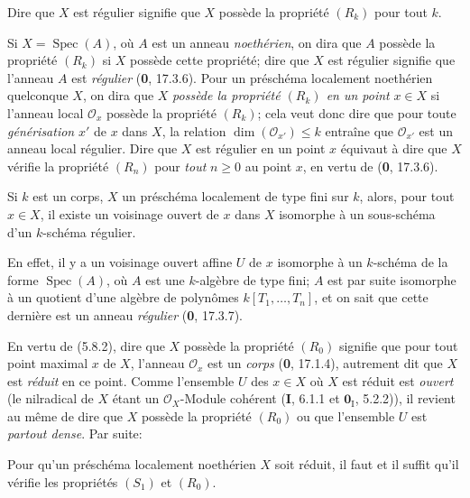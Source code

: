 Dire que $X$ est régulier signifie que $X$ possède la propriété $(R_k)$ pour
tout $k$.

Si $X=\operatorname{Spec}(A)$, où $A$ est un anneau \emph{noethérien}, on dira que
$A$ possède la propriété $(R_k)$ si $X$ possède cette propriété; dire que
$X$ est régulier signifie que l'anneau $A$ est \emph{régulier} (\textbf{0}, 17.3.6). Pour un
préschéma localement noethérien quelconque $X$, on dira que $X$ \emph{possède la
propriété $(R_k)$ en un point} $x\in X$ si l'anneau local $\mathcal O_x$
possède la propriété $(R_k)$; cela veut donc dire que pour toute \emph{générisation}
$x'$ de $x$ dans $X$, la relation $\dim(\mathcal O_{x'})\leq k$ entraîne que
$\mathcal O_{x'}$ est un anneau local régulier. Dire que $X$ est régulier en
un point $x$ équivaut à dire que $X$ vérifie la propriété $(R_n)$ pour \emph{tout}
$n\geq0$ au point $x$, en vertu de (\textbf{0}, 17.3.6).

\begin{proposition}[5.8.3]
\label{IV.2.s5.8.3-fr}
Si $k$ est un corps, $X$ un préschéma localement de type fini sur $k$, alors,
pour tout $x\in X$, il existe un voisinage ouvert de $x$ dans $X$ isomorphe à
un sous-schéma d'un $k$-schéma régulier.
\end{proposition}

En effet, il y a un voisinage ouvert affine $U$ de $x$ isomorphe à un
$k$-schéma de la forme $\operatorname{Spec}(A)$, où $A$ est une $k$-algèbre
de type fini; $A$ est par suite isomorphe à un quotient d'une algèbre de
polynômes $k[T_1,\ldots,T_n]$, et on sait que cette dernière est un anneau
\emph{régulier} (\textbf{0}, 17.3.7).

\begin{env}[5.8.4]
\label{IV.2.s5.8.4-fr}
En vertu de (5.8.2), dire que $X$ possède la propriété $(R_0)$ signifie que
pour tout point maximal $x$ de $X$, l'anneau $\mathcal O_x$ est un \emph{corps}
(\textbf{0}, 17.1.4), autrement dit que $X$ est \emph{réduit} en ce point. Comme l'ensemble
$U$ des $x\in X$ où $X$ est réduit est \emph{ouvert} (le
nilradical de $X$ étant un $\mathcal O_X$-Module cohérent (\textbf{I}, 6.1.1 et
$\mathbf{0}_{\mathrm I}$, 5.2.2)), il revient au même de dire que $X$ possède la
propriété $(R_0)$ ou que l'ensemble $U$ est \emph{partout dense}. Par suite:
\end{env}

\begin{proposition}[5.8.5]
\label{IV.2.s5.8.5-fr}
Pour qu'un préschéma localement noethérien $X$ soit réduit, il faut et il
suffit qu'il vérifie les propriétés $(S_1)$ et $(R_0)$.
\end{proposition}

